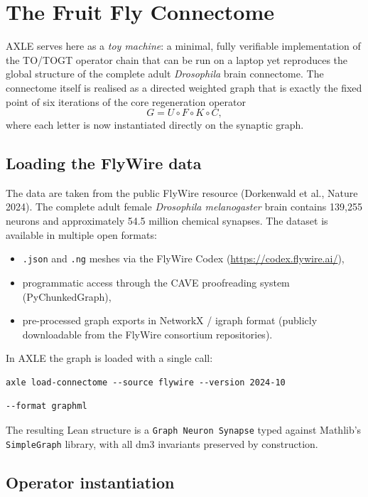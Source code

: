 \documentclass[19pt]{book}
\theoremstyle{plain}
\theoremstyle{definition}
\theoremstyle{remark}
\begin{document}
\chapter{The Fruit Fly Connectome}

AXLE serves here as a \emph{toy machine}: a minimal, fully verifiable implementation of the TO/TOGT operator chain that can be run on a laptop yet reproduces the global structure of the complete adult \emph{Drosophila} brain connectome. The connectome itself is realised as a directed weighted graph that is exactly the fixed point of six iterations of the core regeneration operator
\[
G = U \circ F \circ K \circ C,
\]
where each letter is now instantiated directly on the synaptic graph.

\section{Loading the FlyWire data}

The data are taken from the public FlyWire resource (Dorkenwald et al., Nature 2024). The complete adult female \emph{Drosophila melanogaster} brain contains 139{,}255 neurons and approximately 54.5 million chemical synapses. The dataset is available in multiple open formats:

\begin{itemize}
\item \texttt{.json} and \texttt{.ng} meshes via the FlyWire Codex (\url{https://codex.flywire.ai/}),
\item programmatic access through the CAVE proofreading system (PyChunkedGraph),
\item pre-processed graph exports in NetworkX / igraph format (publicly downloadable from the FlyWire consortium repositories).
\end{itemize}

In AXLE the graph is loaded with a single call:
\begin{verbatim}
axle load-connectome --source flywire --version 2024-10
\end{verbatim} \begin{verbatim}
--format graphml
\end{verbatim}
The resulting Lean structure is a \texttt{Graph Neuron Synapse} typed against Mathlib’s \texttt{SimpleGraph} library, with all dm3 invariants preserved by construction.

\section{Operator instantiation}
\end{document}
